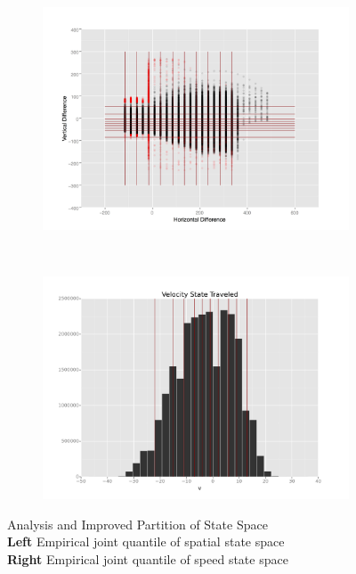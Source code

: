 \documentclass[11pt]{article}
\theoremstyle{definition}
\begin{document}
\begin{figure}[!h]
        \centering
        \begin{subfigure}[b]{0.3\textwidth}
                \includegraphics[width=\textwidth]{"./plots/s_scatter_grid"}
        \end{subfigure}%
~
        \begin{subfigure}[b]{0.3\textwidth}
                \includegraphics[width=\textwidth]{"./plots/v_hist_grid"}
        \end{subfigure}
  \caption{Analysis and Improved Partition of State Space\\ 
  \textbf{Left} Empirical joint quantile of spatial state space \\
  \textbf{Right} Empirical joint quantile of speed state space}
  \label{fig:part_initial2}
\end{figure}
\end{document}
